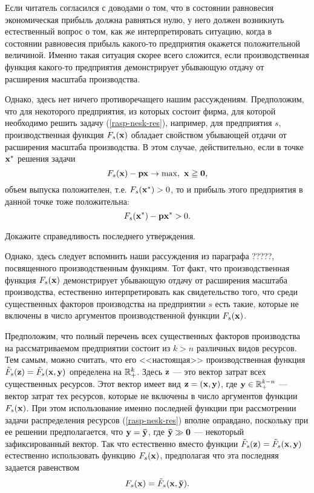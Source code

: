     Если читатель согласился с доводами о том, что в состоянии
    равновесия экономическая прибыль должна равняться нулю, у него
    должен возникнуть естественный вопрос о том, как же
    интерпретировать ситуацию, когда в состоянии равновесия прибыль
    какого-то предприятия окажется положительной величиной. Именно
    такая ситуация скорее всего сложится, если производственная
    функция какого-то
    предприятия демонстрирует убывающую отдачу от расширения
    масштаба производства.

    Однако, здесь нет ничего противоречащего нашим рассуждениям.
    Предположим, что для некоторого предприятия, из которых состоит
    фирма, для которой необходимо решить задачу (\ref{rasp-nesk-res}),
    например, для предприятия $s$,  производственная функция
    $F_{s}(\mathbf{x})$
     обладает свойством убывающей отдачи от
    расширения масштаба производства. В этом случае, действительно,
    если в точке $\mathbf{x^{*}}$ решения задачи
\[
    F_{s}(\vc{x})-\vc{p}\vc{x}\rightarrow\max, \ \vc{x}\geqq\vc{0},
\]
    объем выпуска положителен, т.е. $F_{s}(\mathbf{x^{*}})>0$, то и
    прибыль этого предприятия в данной точке тоже положительна:
\[
    F_{s}(\mathbf{x^{*}})-\mathbf{p}\mathbf{x^{*}}>0.
\]
\begin{exer}
    Докажите справедливость последнего утверждения.
\end{exer}
    Однако, здесь следует вспомнить наши рассуждения из параграфа
    ?????, посвященного производственным функциям. Тот факт, что
    производственная функция $F_{s}(\mathbf{x})$ демонстрирует убывающую
    отдачу от расширения масштаба производства, естественно
    интерпретировать как свидетельство того, что среди существенных
    факторов производства на предприятии $s$ есть такие, которые не
    включены в число аргументов производственной функции
    $F_{s}(\mathbf{x})$.

    Предположим, что полный перечень всех существенных
    факторов производства на рассматриваемом предприятии состоит из
    $k>n$ различных видов ресурсов.
     Тем самым, можно считать, что его <<настоящая>>
    производственная функция $\tilde{F}_{s}(\mathbf{z})=\tilde{F}_{s}(\mathbf{x},\mathbf{y})$ определена на
    $\mathbb{R}^{k}_{+}$. Здесь $\mathbf{z}$ --- это вектор затрат всех
    существенных ресурсов. Этот вектор имеет вид
    $\mathbf{z}=(\mathbf{x},\mathbf{y})$, где $\mathbf{y}\in\mathbb{R}^{k-n}_{+}$ --- вектор
    затрат тех ресурсов, которые не включены в число аргументов функции
    $F_{s}(\mathbf{x})$. При этом использование именно последней функции при
    рассмотрении задачи распределения ресурсов (\ref{rasp-nesk-res})
    вполне оправдано, поскольку при ее решении
    предполагается, что $\mathbf{y}=\mathbf{\bar{y}}$, где
    $\mathbf{\bar{y}}\gg\mathbf{0}$  --- некоторый зафиксированный вектор.
    Так что естественно вместо функции
    $\tilde{F}_{s}(\mathbf{z})=\tilde{F}_{s}(\mathbf{x},\mathbf{y})$
    естественно использовать функцию $F_{s}(\mathbf{x})$, предполагая
    что эта последняя задается равенством
\[
    F_{s}(\mathbf{x})=\tilde{F}_{s}(\mathbf{x},\mathbf{\bar{y}}).
\]

